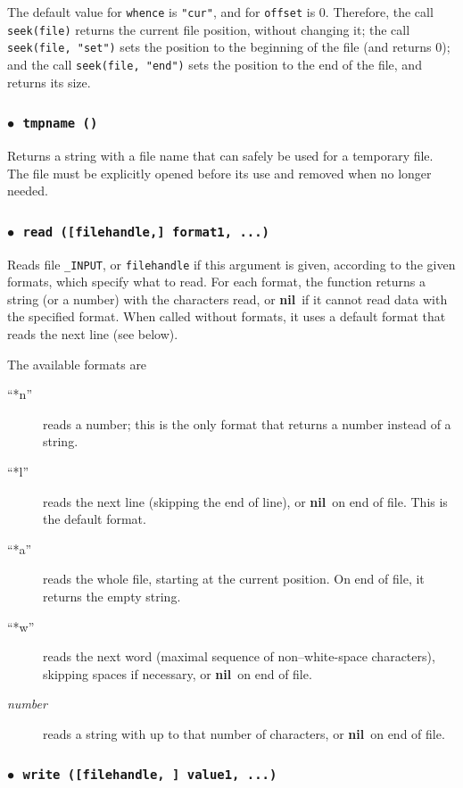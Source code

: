 \documentclass[11pt]{article}
\newcommand{\T}[1]{{\tt #1}}
\newcommand{\nil}{{\bf nil}}
\newcommand{\Deffunc}[1]{\index{#1}}
\newcommand{\ff}{$\bullet$\ }
\begin{document}
The default value for \verb|whence| is \verb|"cur"|,
and for \verb|offset| is 0.
Therefore, the call \verb|seek(file)| returns the current
file position, without changing it;
the call \verb|seek(file, "set")| sets the position to the
beginning of the file (and returns 0);
and the call \verb|seek(file, "end")| sets the position to the
end of the file, and returns its size.

\subsubsection*{\ff \T{tmpname ()}}\Deffunc{tmpname}

Returns a string with a file name that can safely
be used for a temporary file.
The file must be explicitly opened before its use
and removed when no longer needed.

\subsubsection*{\ff \T{read ([filehandle,] format1, ...)}}\Deffunc{read}

Reads file \verb|_INPUT|,
or \verb|filehandle| if this argument is given,
according to the given formats, which specify what to read.
For each format,
the function returns a string (or a number) with the characters read,
or \nil\ if it cannot read data with the specified format.
When called without formats,
it uses a default format that reads the next line
(see below).

The available formats are
\begin{description}
\item[``*n''] reads a number;
this is the only format that returns a number instead of a string.
\item[``*l''] reads the next line
(skipping the end of line), or \nil\ on end of file.
This is the default format.
\item[``*a''] reads the whole file, starting at the current position.
On end of file, it returns the empty string.
\item[``*w''] reads the next word
(maximal sequence of non--white-space characters),
skipping spaces if necessary, or \nil\ on end of file.
\item[\emph{number}] reads a string with up to that number of characters,
or \nil\ on end of file.
\end{description}

\subsubsection*{\ff \T{write ([filehandle, ] value1, ...)}}\Deffunc{write}
\end{document}
